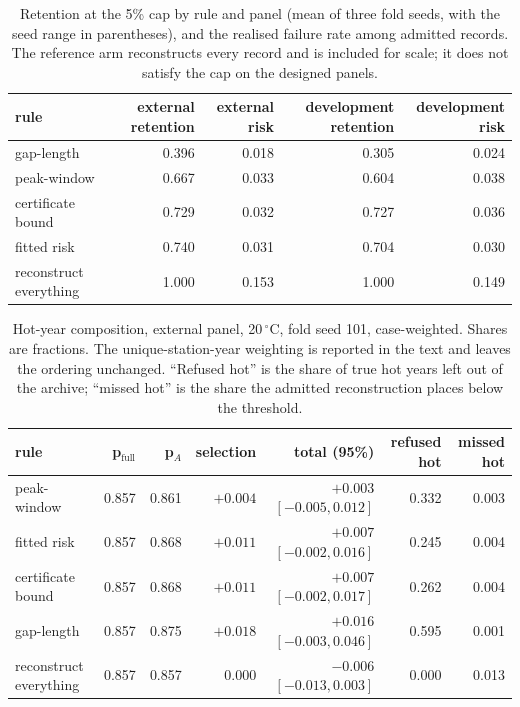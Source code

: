 \documentclass[draft]{agujournal2025}
\newcommand{\tabletext}{%
  \footnotesize
  \setlength{\baselineskip}{10pt}%
  \setlength{\parindent}{0pt}%
}
\begin{document}
\begin{table}
\caption{Retention at the 5\% cap by rule and panel (mean of three fold seeds,
with the seed range in parentheses), and the realised failure rate among admitted
records. The reference arm reconstructs every record and is included for scale;
it does not satisfy the cap on the designed panels.}
\label{tab:si-cap}
\tabletext
\centering
\begin{tabular}{lrrrr}
\hline
rule & external retention & external risk & development retention & development risk \\
\hline
gap-length & 0.396 & 0.018 & 0.305 & 0.024 \\
peak-window & 0.667 & 0.033 & 0.604 & 0.038 \\
certificate bound & 0.729 & 0.032 & 0.727 & 0.036 \\
fitted risk & 0.740 & 0.031 & 0.704 & 0.030 \\
reconstruct everything & 1.000 & 0.153 & 1.000 & 0.149 \\
\hline
\end{tabular}
\end{table}

\begin{table}
\caption{Hot-year composition, external panel, 20\,$^{\circ}$C, fold seed 101,
case-weighted. Shares are fractions. The unique-station-year weighting is
reported in the text and leaves the ordering unchanged.
``Refused hot'' is the share of true hot years left out of the archive;
``missed hot'' is the share the admitted reconstruction places below the
threshold.}
\label{tab:si-hot}
\tabletext
\centering
\begin{tabular}{lrrrrrr}
\hline
rule & p$_{\text{full}}$ & p$_A$ & selection & total (95\%) & refused hot & missed hot \\
\hline
peak-window & 0.857 & 0.861 & $+0.004$ & $+0.003$ $[-0.005,0.012]$ & 0.332 & 0.003 \\
fitted risk & 0.857 & 0.868 & $+0.011$ & $+0.007$ $[-0.002,0.016]$ & 0.245 & 0.004 \\
certificate bound & 0.857 & 0.868 & $+0.011$ & $+0.007$ $[-0.002,0.017]$ & 0.262 & 0.004 \\
gap-length & 0.857 & 0.875 & $+0.018$ & $+0.016$ $[-0.003,0.046]$ & 0.595 & 0.001 \\
reconstruct everything & 0.857 & 0.857 & $0.000$ & $-0.006$ $[-0.013,0.003]$ & 0.000 & 0.013 \\
\hline
\end{tabular}
\end{table}
\end{document}
